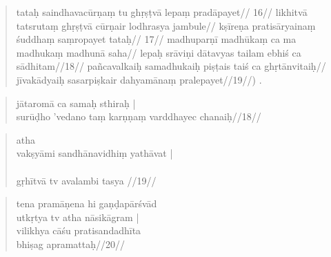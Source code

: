 \documentclass [12pt]{article}%
\begin{document}
\begin{sanskrit}
\begin{verse}
{{  tataḥ saindhavacūrṇaṃ tu ghṛṣṭvā lepaṃ pradāpayet// 16//
  likhitvā tatsrutaṃ ghṛṣṭvā cūrṇair lodhrasya jambule//  
  kṣīreṇa pratisāryainaṃ śuddhaṃ saṃropayet tataḥ// 17//
  madhuparṇī madhūkaṃ ca ma madhukaṃ madhunā saha//  
  lepaḥ srāviṇi dātavyas tailam ebhiś ca sādhitam//18// 
  pañcavalkaiḥ samadhukaiḥ piṣṭais taiś ca ghṛtānvitaiḥ//  
  jīvakādyaiḥ sasarpiṣkair dahyamānaṃ pralepayet//19//) \A.}
}
 \end{verse} 
\pend\bigskip
%
%
\pstart
\begin{verse}
jātaromā\emph{}  ca  samaḥ sthiraḥ |\\
surūḍho 'vedano   taṃ karṇṇaṃ varddhayec chanaiḥ//18//
\end{verse}
\pend\bigskip


\pstart
\begin{verse}
 atha \\
vakṣyāmi sandhānavidhiṃ yathāvat |\\ 
   \\  
 gṛhītvā tv avalambi tasya 
//19//
 \end{verse}
\pend\bigskip


\pstart
\begin{verse}
 tena pramāṇena hi gaṇḍapārśvād\\  
 utkṛtya  tv atha nāsikāgram |\\  
vilikhya cāśu pratisandadhīta\\ 
  bhiṣag apramattaḥ//20//
\end{verse}
\pend\bigskip



\end{sanskrit}
\end{document}
